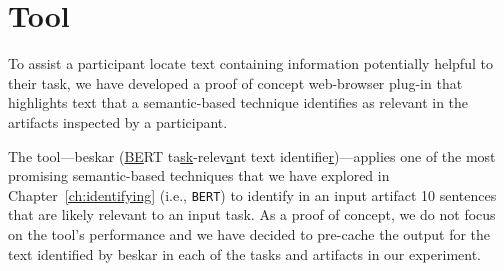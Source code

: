 \section{Tool}
\label{cp6:tool}


To assist a participant locate text containing information potentially helpful to their task, we have developed a proof of concept web-browser plug-in 
that highlights text that a semantic-based technique 
identifies as relevant in the artifacts inspected by a participant.



The tool---\acs{beskar} (\underline{BE}RT ta\underline{sk}-relev\underline{a}nt text identifie\underline{r})---applies 
one of the most promising semantic-based techniques that we have explored in Chapter~\ref{ch:identifying} (i.e., \texttt{BERT})
to identify in an input artifact 10 sentences that are likely relevant to an input task. 
As a proof of concept, we do not focus on the tool's performance
and we have decided to pre-cache the output 
for the text identified by \acs{beskar} in each of the tasks and artifacts 
in our experiment. 






